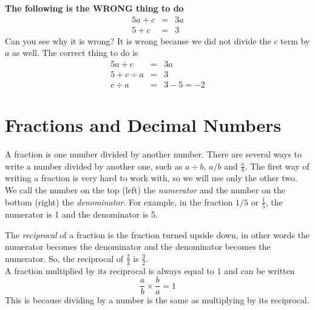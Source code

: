 \documentclass[10pt,a4paper,titlepage,twoside,openright]{report}
\begin{document}
\textbf{The following is the WRONG thing to do}
\begin{eqnarray}
  \label{eq:mfoundation:alg:r:multwrong}
  5a+c&=&3a\\ \nonumber
   5+c&=&3 
\end{eqnarray}
Can you see why it is wrong? It is wrong because we did not divide the $c$ term
by $a$ as well. The correct thing to do is 
\begin{eqnarray}
  \label{eq:mfoundation:alg:r:multcorrect}
  5a+c&=&3a\\ \nonumber
  5+c\div a&=&3\\ \nonumber
  c\div a&=& 3-5=-2
\end{eqnarray}


\section{Fractions and Decimal Numbers}
\label{mfoundation:fd}
A fraction is one number divided by another number. There are several ways to
write a number divided by another one, such as $a\div b$, $a/b$ and $\frac ab$.
The first way of writing a fraction is very hard to work with, so we will use
only the other two. We call the number on the top (left) the \textit{numerator} and
the number on the bottom (right) the \textit{denominator}. For example, in the fraction
$1/5$ or $\frac{1}{5}$, the numerator is 1 and the denominator is 5.


The \textit{reciprocal} of a fraction is the fraction turned upside down, in
other words the numerator becomes the denominator and the denominator becomes
the numerator. So, the reciprocal of $\frac{2}{3}$ is $\frac{3}{2}$.
\\
A fraction multiplied by its reciprocal is always equal to $1$ and can be
written
\begin{equation}
\label{eq:mfoundation:fd:recip}
\frac{a}{b}\times\frac{b}{a} = 1
\end{equation}
This is because dividing by a number is the same as multiplying by its
reciprocal. 
\end{document}

